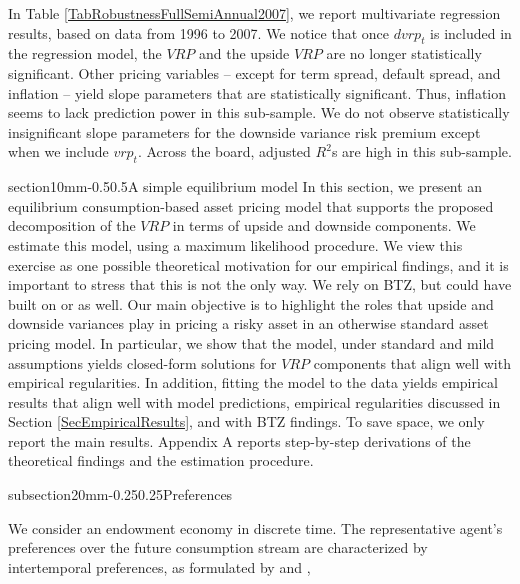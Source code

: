 \documentclass[11pt]{article}
\makeatletter
\renewcommand\subsection{\@startsection%
    {subsection}{2}{0mm}{-0.25\baselineskip}{0.25\baselineskip}{\bfseries\large}}
\renewcommand\section{\@startsection%
    {section}{1}{0mm}{-0.5\baselineskip}{0.5\baselineskip}{\bfseries\Large}}
\makeatother
\begin{document}
In Table \ref{TabRobustnessFullSemiAnnual2007}, we report multivariate regression results, based on data from 1996 to 2007. We notice that once $dvrp_t$ is included in the regression model, the $VRP$ and  the upside $VRP$ are no longer statistically significant. Other pricing variables -- except for term spread, default spread, and inflation -- yield slope parameters that are statistically significant. Thus, inflation seems to lack prediction power in this sub-sample. We do not observe statistically insignificant slope parameters for the downside variance risk premium except when we include $vrp_t$. Across the board, adjusted $R^2$s are high in this sub-sample.

\section{A simple equilibrium model}\label{SecTheoreticalModel}
In this section, we present an equilibrium consumption-based asset pricing model that supports the proposed decomposition of the $VRP$ in terms of upside and downside components. We estimate this model, using a maximum likelihood procedure. We view this exercise as one possible theoretical motivation for our empirical findings, and it is important to stress that this is not the only way. We rely on BTZ, but could have built on \cite{BandiReno} or \cite{DrechslerYaron11RFS} as well. Our main objective is to highlight the roles that upside and downside variances play in pricing a risky asset in an otherwise standard asset pricing model. In particular, we show that the model, under standard and mild assumptions yields closed-form solutions for $VRP$ components that align well with empirical regularities. In addition, fitting the model to the data yields empirical results that align well with model predictions, empirical regularities discussed in Section \ref{SecEmpiricalResults}, and with BTZ findings. To save space, we only report the main results. Appendix A reports step-by-step derivations of the theoretical findings and the estimation procedure.

\subsection{Preferences}

We consider an endowment economy in discrete time. The representative agent's
preferences over the future consumption stream are characterized by \cite{KrepsPorteus78Econometrica} intertemporal preferences, as formulated by \cite{EZ89Econometrica} and \cite{Weil89JME},
\end{document}
